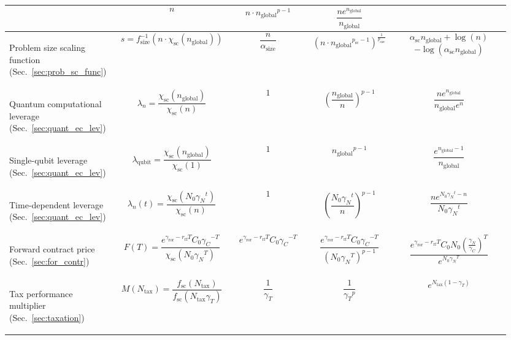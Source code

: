 \begin{table}[!htbp]
{\begin{tabular}{|m{0.21\linewidth}|m{0.21\linewidth}|m{0.15\linewidth}|m{0.155\linewidth}|m{0.225\linewidth}|}
\[\] & \[n\] & \[n\cdot{n_\mathrm{global}}^{p-1}\] & \[\frac{n e^{n_\mathrm{global}}}{n_\mathrm{global}}\]\\
	\hline
	\begin{flushleft}Problem size scaling function (Sec.~\ref{sec:prob_sc_func})\end{flushleft} & \[s = f_\mathrm{size}^{-1}(n\cdot \chi_\mathrm{sc}(n_\mathrm{global}))\] & \[\frac{n}{\alpha_\mathrm{size}}\] & \[(n \cdot {n_\mathrm{global}}^{p_\mathrm{sc}-1})^\frac{1}{p_\mathrm{size}}\] & \[\alpha_\mathrm{sc}n_\mathrm{global} + \log(n)\]\[-\log(\alpha_\mathrm{sc}n_\mathrm{global})\] \\
	\hline
	\begin{flushleft}Quantum computational leverage (Sec.~\ref{sec:quant_ec_lev})\end{flushleft} & \[\lambda_n=\frac{\chi_\mathrm{sc}(n_\mathrm{global})}{\chi_\mathrm{sc}(n)}\] & \[1\] & \[\left(\frac{n_\mathrm{global}}{n}\right)^{p-1}\] & \[\frac{n e^{n_\mathrm{global}}}{n_\mathrm{global}e^n}\]\\
	\hline
	\begin{flushleft}Single-qubit leverage (Sec.~\ref{sec:quant_ec_lev})\end{flushleft} & \[\lambda_\mathrm{qubit}=\frac{\chi_\mathrm{sc}(n_\mathrm{global})}{\chi_\mathrm{sc}(1)}\] & \[1\] & \[{n_\mathrm{global}}^{p-1}\] & \[\frac{e^{n_\mathrm{global}-1}}{n_\mathrm{global}}\]\\
	\hline
	\begin{flushleft}Time-dependent leverage (Sec.~\ref{sec:quant_ec_lev})\end{flushleft} & \[\lambda_n(t)=\frac{\chi_\mathrm{sc}(N_0{\gamma_N}^t)}{\chi_\mathrm{sc}(n)}\] &  \[1\] & \[\left(\frac{N_0{\gamma_N}^t}{n}\right)^{p-1}\] & \[\frac{n e^{N_0{\gamma_N}^t-n}}{N_0{\gamma_N}^t}\]\\
	\hline
	\begin{flushleft}Forward contract price (Sec.~\ref{sec:for_contr})\end{flushleft} & \[F(T)=\frac{e^{\gamma_\mathrm{ror}-r_\mathrm{rf}T} C_0{\gamma_C}^{-T}}{\chi_\mathrm{sc}(N_0 {\gamma_N}^T)}\]
 & \[e^{\gamma_\mathrm{ror}-r_\mathrm{rf}T} C_0{\gamma_C}^{-T}\] & \[\frac{e^{\gamma_\mathrm{ror}-r_\mathrm{rf}T} C_0{\gamma_C}^{-T}}{(N_0 {\gamma_N}^T)^{p-1}}\] & \[\frac{e^{\gamma_\mathrm{ror}-r_\mathrm{rf}T} C_0N_0\left(\frac{\gamma_N}{\gamma_C}\right)^T}{e^{N_0 {\gamma_N}^T}}\] \\
	\hline
	\begin{flushleft}Tax performance multiplier (Sec.~\ref{sec:taxation})\end{flushleft} & \[M(N_\mathrm{tax})=\frac{f_\mathrm{sc}(N_\mathrm{tax})}{f_\mathrm{sc}(N_\mathrm{tax} \gamma_T)}\] & \[\frac{1}{\gamma_T}\] & \[\frac{1}{{\gamma_T}^p}\] & \[e^{N_\mathrm{tax}(1-\gamma_T)}\]\\

\end{tabular}}
\end{table}
